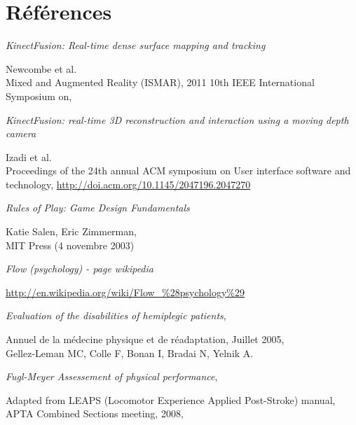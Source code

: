 \section{Références}
\begin{thebibliography}{200}
\makeatletter
    \@clubpenalty \clubpenalty
\makeatother

\begin{footnotesize}

  \emph{KinectFusion: Real-time dense surface mapping and tracking}
  \begin{tiny}
  Newcombe et al.\\
  Mixed and Augmented Reality (ISMAR), 2011 10th IEEE International Symposium on,
  \end{tiny}

  \emph{KinectFusion: real-time 3D reconstruction and interaction using a moving depth camera}
  \begin{tiny}
  Izadi et al.\\
  Proceedings of the 24th annual ACM symposium on User interface software and technology,
  \url{http://doi.acm.org/10.1145/2047196.2047270}
  \end{tiny}
  
  \emph{Rules of Play: Game Design Fundamentals}\\
  \begin{tiny}
  Katie Salen, Eric Zimmerman,\\
  MIT Press (4 novembre 2003)
  \end{tiny}

  \emph{Flow (psychology) - page wikipedia}\\
  \begin{tiny}
  \url{http://en.wikipedia.org/wiki/Flow_\%28psychology\%29}
  \end{tiny}
  
  \emph{Evaluation of the disabilities of hemiplegic patients},\\
  \begin{tiny}
  Annuel de la médecine physique et de réadaptation, Juillet 2005,\\
  Gellez-Leman MC, Colle F, Bonan I, Bradai N, Yelnik A.\\
  \end{tiny}
  
  \emph{Fugl-Meyer Assessement of physical performance},\\
  \begin{tiny}
  Adapted from LEAPS (Locomotor Experience Applied Post-Stroke) manual,\\
  APTA Combined Sections meeting, 2008,\\
  \end{tiny}


\end{footnotesize}
\end{thebibliography}
